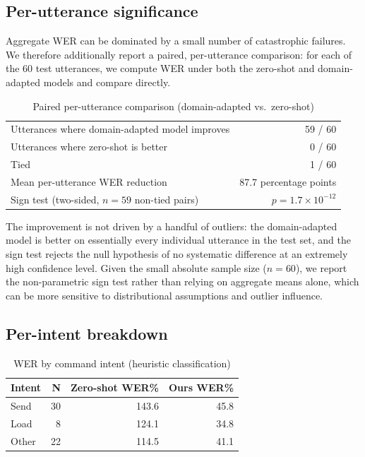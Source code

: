 \documentclass[11pt,a4paper]{article}
\begin{document}
\subsection{Per-utterance significance}

Aggregate WER can be dominated by a small number of catastrophic failures.
We therefore additionally report a paired, per-utterance comparison: for
each of the 60 test utterances, we compute WER under both the zero-shot
and domain-adapted models and compare directly.

\begin{table}[H]
\centering
\caption{Paired per-utterance comparison (domain-adapted vs.\ zero-shot)}
\label{tab:paired}
\begin{tabular}{lr}
\toprule
Utterances where domain-adapted model improves & 59 / 60 \\
Utterances where zero-shot is better & 0 / 60 \\
Tied & 1 / 60 \\
Mean per-utterance WER reduction & 87.7 percentage points \\
Sign test (two-sided, $n=59$ non-tied pairs) & $p = 1.7\times10^{-12}$ \\
\bottomrule
\end{tabular}
\end{table}

The improvement is not driven by a handful of outliers: the domain-adapted
model is better on essentially every individual utterance in the test set,
and the sign test rejects the null hypothesis of no systematic difference
at an extremely high confidence level. Given the small absolute sample
size ($n=60$), we report the non-parametric sign test rather than relying
on aggregate means alone, which can be more sensitive to distributional
assumptions and outlier influence.

\subsection{Per-intent breakdown}

\begin{table}[H]
\centering
\caption{WER by command intent (heuristic classification)}
\label{tab:intent}
\begin{tabular}{lrrr}
\toprule
\textbf{Intent} & \textbf{N} & \textbf{Zero-shot WER\%} & \textbf{Ours WER\%} \\
\midrule
Send     & 30 & 143.6 & 45.8 \\
Load     &  8 & 124.1 & 34.8 \\
Other    & 22 & 114.5 & 41.1 \\
\bottomrule
\end{tabular}
\end{table}
\end{document}
